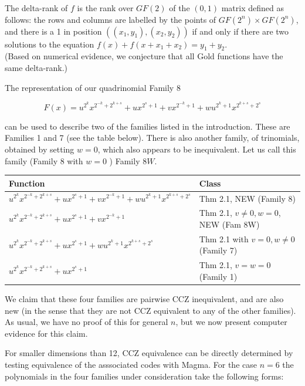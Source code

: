 \documentclass[10pt]{article}
\begin{document}
The delta-rank of $f$ is the rank over $G F(2)$ of the $(0,1)$ matrix defined as follows: the rows and columns are labelled by the points of $G F\left(2^{n}\right) \times G F\left(2^{n}\right)$, and there is a 1 in position $\left(\left(x_{1}, y_{1}\right),\left(x_{2}, y_{2}\right)\right)$ if and only if there are two solutions to the equation $f(x)+f\left(x+x_{1}+x_{2}\right)=y_{1}+y_{2}$.\\
(Based on numerical evidence, we conjecture that all Gold functions have the same delta-rank.)

The representation of our quadrinomial Family 8

$$
F(x)=u^{2^{k}} x^{2^{-k}+2^{k+s}}+u x^{2^{s}+1}+v x^{2^{-k}+1}+w u^{2^{k}+1} x^{2^{k+s}+2^{s}}
$$

can be used to describe two of the families listed in the introduction. These are Families 1 and 7 (see the table below). There is also another family, of trinomials, obtained by setting $w=0$, which also appears to be inequivalent. Let us call this family (Family 8 with $w=0$ ) Family $8 W$.

\begin{center}
\begin{tabular}{|l|l|}
\hline
Function & Class \\
\hline
$u^{2^{k}} x^{2^{-k}+2^{k+s}}+u x^{2^{s}+1}+v x^{2^{-k}+1}+w u^{2^{k}+1} x^{2^{k+s}+2^{s}}$ & Thm 2.1, NEW (Family 8) \\
\hline
$u^{2^{k}} x^{2^{-k}+2^{k+s}}+u x^{2^{s}+1}+v x^{2^{-k}+1}$ & Thm 2.1, $v \neq 0, w=0$, NEW (Fam 8W) \\
\hline
$u^{2^{k}} x^{2^{-k}+2^{k+s}}+u x^{2^{s}+1}+w u^{2^{k}+1} x^{2^{k+s}+2^{s}}$ & Thm 2.1 with $v=0, w \neq 0$ (Family 7) \\
\hline
$u^{2^{k}} x^{2^{-k}+2^{k+s}}+u x^{2^{s}+1}$ & Thm 2.1, $v=w=0$ (Family 1) \\
\hline
\end{tabular}
\end{center}

We claim that these four families are pairwise CCZ inequivalent, and are also new (in the sense that they are not CCZ equivalent to any of the other families). As usual, we have no proof of this for general $n$, but we now present computer evidence for this claim.

For smaller dimensions than 12, CCZ equivalence can be directly determined by testing equivalence of the asssociated codes with Magma. For the case $n=6$ the polynomials in the four families under consideration take the following forms:
\end{document}
